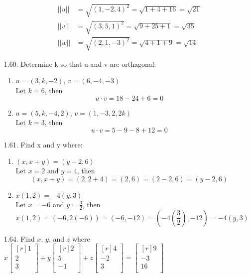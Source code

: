 \documentclass[12pt]{article}
\begin{document}
\begin{enumerate}
\begin{enumerate}
	\begin{align*}
		||u|| &= \sqrt{(1,-2,4)^2} = \sqrt{1+4+16} = \sqrt{21}\\
		||v|| &= \sqrt{(3,5,1)^2}  = \sqrt{9+25+1} = \sqrt{35}\\
		||w|| &= \sqrt{(2,1,-3)^2} = \sqrt{4+1+9}  = \sqrt{14}
	\end{align*}
	\end{enumerate}
\item[1.60.] Determine k so that u and v are orthagonal:
	\begin{enumerate}
	\item $u=(3,k,-2)$, $v=(6,-4,-3)$\\
		Let $k=6$, then
		\[ u \cdot v = 18 - 24 + 6 = 0 \]
	\item $u=(5,k,-4,2)$, $v=(1,-3,2,2k)$\\
		Let $k=3$, then
		\[ u \cdot v = 5 - 9 - 8 + 12 =  0 \]
	\end{enumerate}
\item[1.61.] Find x and y where:
	\begin{enumerate}
	\item $(x,x+y)=(y-2,6)$\\
		Let $x=2$ and $y=4$, then
		\[ (x,x+y) = (2, 2+4) = (2,6) = (2-2,6) = (y-2,6) \]
	\item $x(1,2)=-4(y,3)$\\
		Let $x=-6$ and $y=\frac{3}{2}$, then
		\[ x(1,2) = (-6,2(-6)) = (-6,-12) = (-4(\frac{3}{2}),-12) = -4(y,3) \]
	\end{enumerate}
	
\item[1.64.] Find $x$, $y$, and $z$ where
	$x \begin{bmatrix}[r] 1\\ 2\\ 3\\ \end{bmatrix}
	+ y \begin{bmatrix}[r] 2\\ 5\\ -1\\ \end{bmatrix}
	+ z \begin{bmatrix}[r] 4\\ -2\\ 3\\ \end{bmatrix}
	= \begin{bmatrix}[r] 9\\ -3\\ 16\\ \end{bmatrix}$\\
		

\end{enumerate}
\end{document}
